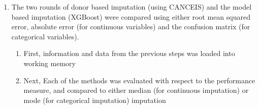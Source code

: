\documentclass[]{book}
\newenvironment{Shaded}{\begin{snugshade}}{\end{snugshade}}
\newcommand{\KeywordTok}[1]{\textcolor[rgb]{0.13,0.29,0.53}{\textbf{#1}}}
\newcommand{\DecValTok}[1]{\textcolor[rgb]{0.00,0.00,0.81}{#1}}
\newcommand{\StringTok}[1]{\textcolor[rgb]{0.31,0.60,0.02}{#1}}
\newcommand{\ControlFlowTok}[1]{\textcolor[rgb]{0.13,0.29,0.53}{\textbf{#1}}}
\newcommand{\OperatorTok}[1]{\textcolor[rgb]{0.81,0.36,0.00}{\textbf{#1}}}
\newcommand{\NormalTok}[1]{#1}
\providecommand{\tightlist}{%
  \setlength{\itemsep}{0pt}\setlength{\parskip}{0pt}}
\begin{document}
\begin{Shaded}
\end{Shaded}

\begin{enumerate}
\def\labelenumi{\arabic{enumi})}
\setcounter{enumi}{7}
\tightlist
\item
  The two rounds of donor based imputation (using CANCEIS) and the model
  based imputation (XGBoost) were compared using either root mean
  squared error, absolute error (for continuous variables) and the
  confusion matrix (for categorical variables).

  \begin{enumerate}
  \def\labelenumii{\roman{enumii})}
  \tightlist
  \item
    First, information and data from the previous steps was loaded into
    working memory\\
  \item
    Next, Each of the methods was evaluated with respect to the
    performance measure, and compared to either median (for continuous
    imputation) or mode (for categorical imputation) imputation
  \end{enumerate}
\end{enumerate}
\end{document}
